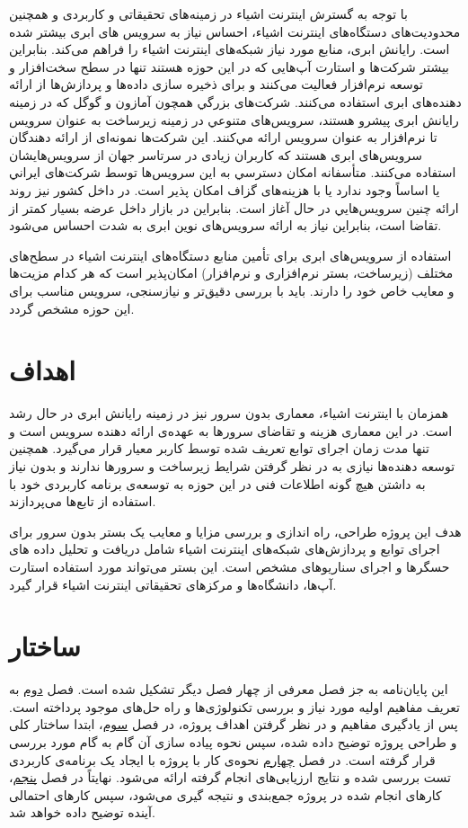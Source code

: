 با توجه به گسترش اینترنت اشیاء در زمینه‌های تحقیقاتی و کاربردی و همچنین محدودیت‌های دستگاه‌های ‌‌اینترنت اشیاء، احساس نیاز به سرویس های ابری بیشتر شده است. رایانش ابری، منابع مورد نیاز شبکه‌های اینترنت اشیاء را فراهم می‌کند. بنابراین بیشتر شرکت‌ها و استارت آپ‌هایی که در این حوزه هستند تنها در سطح سخت‌افزار و توسعه نرم‌افزار فعالیت می‌کنند و برای ذخیره سازی داده‌ها و پردازش‌ها از ارائه دهنده‌های ابری استفاده می‌کنند. شركت‌های بزرگي همچون آمازون و گوگل كه در زمينه رایانش ابری پيشرو هستند، سرويس‌های متنوعي در زمينه زیرساخت به عنوان سرویس تا نرم‌افزار به عنوان سرویس ارائه مي‌كنند. این شرکت‌ها نمونه‌ای از ارائه دهندگان سرویس‌های ابری هستند که کاربران زیادی در سرتاسر جهان از سرویس‌هایشان استفاده می‌کنند. متأسفانه امكان دسترسي به اين سرويس‌ها توسط شرکت‌های ايراني يا اساساً وجود ندارد يا با هزينه‌های گزاف امكان پذير است. در داخل كشور نيز روند ارائه چنين سرويس‌هايي در حال آغاز است. بنابراين در بازار داخل عرضه بسيار كمتر از تقاضا است، بنابراين نياز به ارائه سرويس‌های نوین ابری به شدت احساس می‌شود.

استفاده از سرویس‌های ابری برای تأمین منابع دستگاه‌های اینترنت اشیاء در سطح‌های مختلف (زیرساخت، بستر نرم‌افزاری و نرم‌افزار) امکان‌پذیر است که هر کدام مزیت‌‌ها و معایب خاص خود را دارند. باید با بررسی دقیق‌تر و نیازسنجی، سرویس مناسب برای این حوزه مشخص گردد.

\section{اهداف}

همزمان با اینترنت اشیاء، معماری بدون سرور نیز در زمینه رایانش ابری در حال رشد است. در این معماری هزینه و تقاضای سرورها به عهده‌ی ارائه دهنده سرویس است و تنها مدت زمان اجرای توابع تعریف شده توسط کاربر معیار قرار می‌گیرد. همچنین توسعه دهنده‌ها نیازی به در نظر گرفتن شرايط زيرساخت و سرورها ندارند و بدون نیاز به داشتن هیچ گونه اطلاعات فنی در این حوزه‌ به توسعه‌ی برنامه کاربردی خود با استفاده از تابع‌ها می‌پردازند.

هدف این پروژه طراحی، راه اندازی و بررسی مزایا و معایب یک بستر بدون سرور برای اجرای توابع و پردازش‌های شبکه‌های اینترنت اشیاء شامل دریافت و تحلیل داده های حسگرها و اجرای سناریوهای مشخص است. این بستر می‌تواند مورد استفاده استارت آپ‌ها، دانشگاه‌ها و مرکزهای تحقیقاتی اینترنت اشیاء قرار گیرد.

\section{ساختار}

این پایان‌نامه به جز فصل معرفی از چهار فصل دیگر تشکیل شده است. فصل \hyperref[chapter2]{دوم} به تعریف مفاهیم اولیه مورد نیاز و بررسی تکنولوژی‌ها و راه حل‌های موجود ‌پرداخته است. پس از یادگیری مفاهیم و در نظر گرفتن اهداف پروژه، در فصل \hyperref[chapter3]{سوم}، ابتدا ساختار کلی و طراحی پروژه توضیح داده شده، سپس نحوه پیاده سازی آن گام به گام مورد بررسی قرار گرفته است. در فصل \hyperref[chapter4]{چهارم} نحوه‌ی کار با پروژه با ایجاد یک برنامه‌ی کاربردی تست بررسی شده و نتایج ارزیابی‌های انجام گرفته ارائه می‌شود. نهایتاً در فصل \hyperref[chapter5]{پنجم}، کار‌های انجام شده در پروژه جمع‌بندی و نتیجه گیری می‌شود، سپس کارهای احتمالی آینده توضیح داده خواهد شد.


